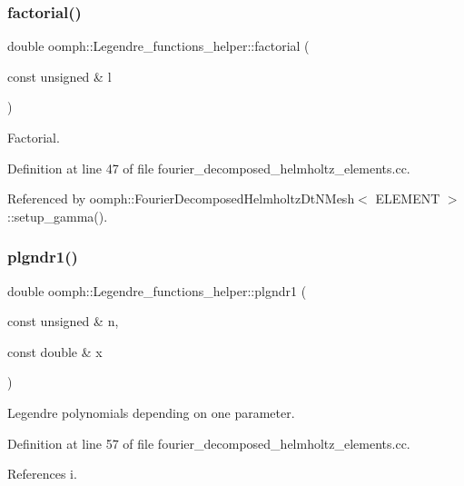 \subsubsection{\texorpdfstring{factorial()}{factorial()}}
{\footnotesize\ttfamily double oomph\+::\+Legendre\+\_\+functions\+\_\+helper\+::factorial (\begin{DoxyParamCaption}\item[{const unsigned \&}]{l }\end{DoxyParamCaption})}



Factorial. 



Definition at line 47 of file fourier\+\_\+decomposed\+\_\+helmholtz\+\_\+elements.\+cc.



Referenced by oomph\+::\+Fourier\+Decomposed\+Helmholtz\+Dt\+N\+Mesh$<$ E\+L\+E\+M\+E\+N\+T $>$\+::setup\+\_\+gamma().

\mbox{\label{namespaceoomph_1_1Legendre__functions__helper_ab30701a5b66d96424a97e10e389be377}} 
\subsubsection{\texorpdfstring{plgndr1()}{plgndr1()}}
{\footnotesize\ttfamily double oomph\+::\+Legendre\+\_\+functions\+\_\+helper\+::plgndr1 (\begin{DoxyParamCaption}\item[{const unsigned \&}]{n,  }\item[{const double \&}]{x }\end{DoxyParamCaption})}



Legendre polynomials depending on one parameter. 



Definition at line 57 of file fourier\+\_\+decomposed\+\_\+helmholtz\+\_\+elements.\+cc.



References i.

\mbox{\label{namespaceoomph_1_1Legendre__functions__helper_ad67fdae863cee220b1051883aac923aa}} 
